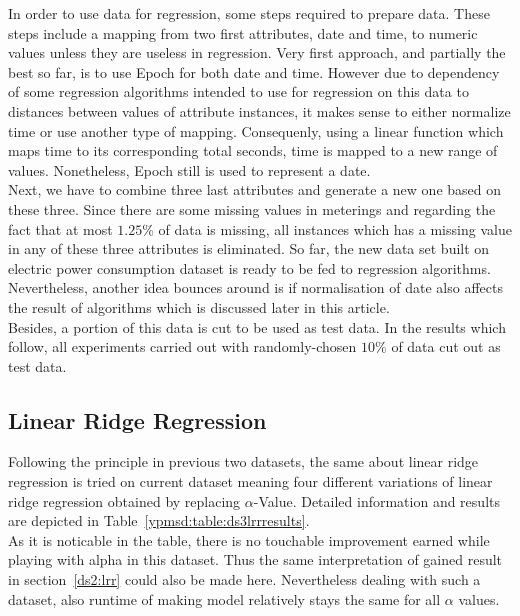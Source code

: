 In order to use data for regression, some steps required to prepare data. These
steps include a mapping from two first attributes, date and time, to numeric
values unless they are useless in regression. Very first approach, and partially
the best so far, is to use Epoch\cite{ritchie1971unix} for both date and time.
However due to dependency of some regression algorithms intended to use for
regression on this data to distances between values of attribute instances, it
makes sense to either normalize time or use another type of mapping.
Consequenly, using a linear function which maps time to its corresponding total
seconds, time is mapped to a new range of values. Nonetheless, Epoch still is
used to represent a date.\\
Next, we have to combine three last attributes and generate a new one based on
these three. Since there are some missing values in meterings and regarding the
fact that at most $1.25\%$ of data is missing, all instances which has a missing
value in any of these three attributes is eliminated. So far, the new data set
built on electric power consumption dataset is ready to be fed to regression
algorithms. \\
Nevertheless, another idea bounces around is if normalisation of
date also affects the result of algorithms which is discussed later in this
article.\\
Besides, a portion of this data is cut to be used as test data. In the results
which follow, all experiments carried out with randomly-chosen $10\%$ of data
cut out as test data.

\subsection{Linear Ridge Regression}

Following the principle in previous two datasets, the same about linear ridge
regression is tried on current dataset meaning four different variations of
linear ridge regression obtained by replacing $\alpha$-Value. Detailed
information and results are depicted in Table~\ref{ypmsd:table:ds3lrrresults}.
\\
As it is noticable in the table, there is no touchable improvement earned while
playing with alpha in this dataset. Thus the same interpretation of gained
result in section~\ref{ds2:lrr} could also be made here. Nevertheless dealing
with such a dataset, also runtime of making model relatively stays the same for all
$\alpha$ values.



